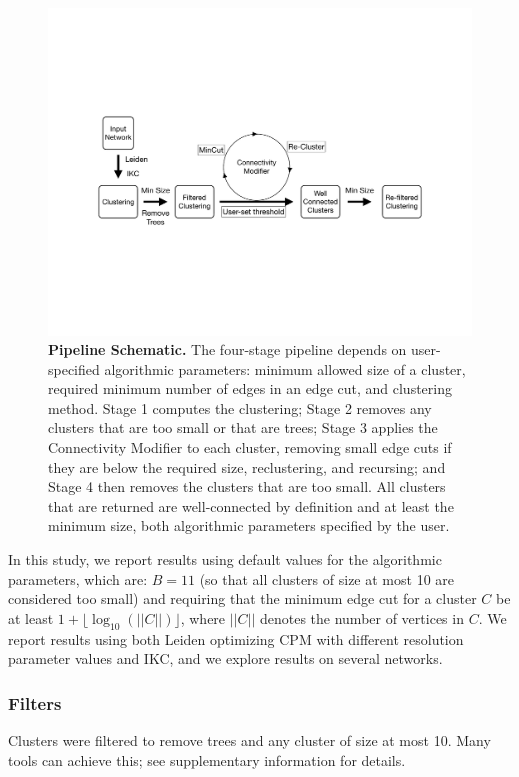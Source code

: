 \documentclass[11pt]{article}   	%
\begin{document}
\begin{figure}[H]
\centering
\includegraphics[width=0.8\linewidth]{figs/workflow.pdf}
\caption{\textbf{Pipeline Schematic.} The four-stage pipeline depends on user-specified algorithmic parameters: minimum allowed size of a cluster, required minimum number of edges in an edge cut, and clustering method.  Stage 1 computes the clustering; Stage 2 removes any clusters that are too small or that are trees;  Stage 3 applies the  Connectivity Modifier to each cluster, removing small edge cuts if they are below the required size, reclustering, and recursing;  and Stage 4 then removes the clusters that are too small. All clusters that are returned are well-connected by definition and at least the minimum size, both algorithmic parameters specified by the user.}
\end{figure}




In this study, we report results using default values for the algorithmic parameters, which are: $B=11$ (so that all clusters of size at most 10 are considered too small) and requiring that the minimum edge cut for a cluster $C$ be at least  $ 1+ \lfloor \log_{10}(||C||) \rfloor$,  where $||C||$ denotes the number of vertices in $C$.
We report results using both Leiden optimizing CPM with different resolution parameter values and IKC, and we explore results on several networks.


\subsubsection{Filters} Clusters were filtered to remove trees and any cluster of size at most 10. Many tools can achieve this; see supplementary information for details.
\end{document}
